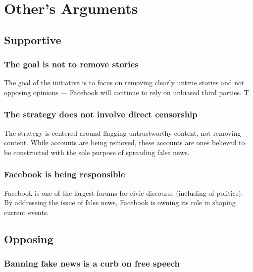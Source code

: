 
\section{Other's Arguments}

\subsection{Supportive}

\subsubsection{The goal is not to remove stories}

\par The goal of the initiative is to focus on removing clearly untrue stories and not opposing opinions --- Facebook will continue to rely on unbiased third parties. \cite{tc_fb_down_ranks_fake_news}
T
\subsubsection{The strategy does not involve direct censorship}

\par The strategy is centered around flagging untrustworthy content, not removing content. While accounts are being removed, these accounts are ones believed to be constructed with the sole purpose of spreading false news. \cite{tc_fb_down_ranks_fake_news}

\subsubsection{Facebook is being responsible}

\par Facebook is one of the largest forums for civic discourse (including of politics). By addressing the issue of false news, Facebook is owning its role in shaping current events. \cite{cnn_fight}

\subsection{Opposing}

\subsubsection{Banning fake news is a curb on free speech}

